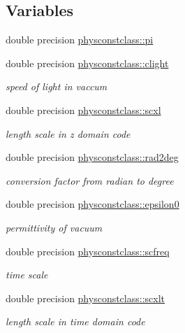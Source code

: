 \subsection*{Variables}
\begin{DoxyCompactItemize}
\item 
double precision \mbox{\hyperlink{namespacephysconstclass_a78e5b579cf4c062c45ae0f9922355783}{physconstclass\+::pi}}
\item 
double precision \mbox{\hyperlink{namespacephysconstclass_a8622c3bd03bb3706b061386b694c8f71}{physconstclass\+::clight}}
\begin{DoxyCompactList}\small\item\em speed of light in vaccum \end{DoxyCompactList}\item 
double precision \mbox{\hyperlink{namespacephysconstclass_af2c99b666d1986d824837a37dd85cd50}{physconstclass\+::scxl}}
\begin{DoxyCompactList}\small\item\em length scale in z domain code \end{DoxyCompactList}\item 
double precision \mbox{\hyperlink{namespacephysconstclass_a1f59be9127e8be0b50b2f15277976fb2}{physconstclass\+::rad2deg}}
\begin{DoxyCompactList}\small\item\em conversion factor from radian to degree \end{DoxyCompactList}\item 
double precision \mbox{\hyperlink{namespacephysconstclass_affe5679370336ffdace4ff9f095211f9}{physconstclass\+::epsilon0}}
\begin{DoxyCompactList}\small\item\em permittivity of vacuum \end{DoxyCompactList}\item 
double precision \mbox{\hyperlink{namespacephysconstclass_a72551429ee6cdefac23bdaafc09bb169}{physconstclass\+::scfreq}}
\begin{DoxyCompactList}\small\item\em time scale \end{DoxyCompactList}\item 
double precision \mbox{\hyperlink{namespacephysconstclass_a32381ca7ccc85dd961e4540f5e6c44fd}{physconstclass\+::scxlt}}
\begin{DoxyCompactList}\small\item\em length scale in time domain code \end{DoxyCompactList}\item 

\end{DoxyCompactItemize}
